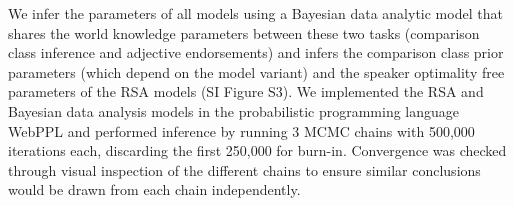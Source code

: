 \documentclass[doc]{apa6}
\begin{document}


We infer the parameters of all models using a Bayesian data analytic model that shares the world knowledge parameters between these two tasks (comparison class inference and adjective endorsements) and infers the comparison class prior parameters (which depend on the model variant) and the speaker optimality free parameters of the RSA models (SI Figure S3).
We implemented the RSA and Bayesian data analysis models in the probabilistic programming language WebPPL \cite{dippl} and performed inference by running 3 MCMC chains with 500,000 iterations each, discarding the first 250,000 for burn-in.
Convergence was checked through visual inspection of the different chains to ensure similar conclusions would be drawn from each chain independently.

\end{document}

